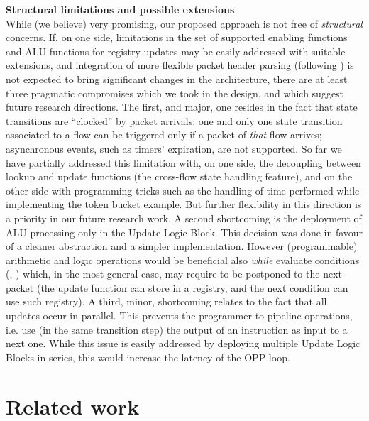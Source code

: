 \documentclass{sig-alternate}
\begin{document}
\vspace{3pt} \noindent \textbf{Structural limitations and possible extensions} \\
While (we believe) very promising, our proposed approach is not free of {\em structural} concerns. If, on one side, limitations in the set of supported enabling functions and ALU functions for registry updates may be easily addressed with suitable extensions, and integration of more flexible packet header parsing (following \cite{Bos14}) is not expected to bring significant changes in the architecture, there are at least three pragmatic compromises which we took in the design, and which suggest future research directions. The first, and major, one resides in the fact that state transitions are ``clocked'' by packet arrivals: one and only one state transition associated to a flow can be triggered only if a packet of {\em that} flow arrives; asynchronous events, such as timers' expiration, are not supported. So far we have partially addressed this limitation with, on one side, the decoupling between lookup and update functions (the cross-flow state handling feature), and on the other side with programming tricks such as the handling of time performed while implementing the token bucket example. But further flexibility in this direction is a priority in our future research work.  A second shortcoming is the deployment of ALU processing only in the Update Logic Block. This decision was done in favour of a cleaner abstraction and a simpler implementation. However (programmable) arithmetic and logic operations would be beneficial also {\em while} evaluate conditions (, ) which, in the most general case, may require to be postponed to the next packet (the update function can store  in a registry, and the next condition can use such registry). A third, minor, shortcoming relates to the fact that all updates occur in parallel. This prevents the programmer to pipeline operations, i.e. use (in the same transition step) the output of an instruction as input to a next one. While this issue is easily addressed by deploying multiple Update Logic Blocks in series, this would increase the latency of the OPP loop.




\section{Related work}
\label{s:related}
\end{document}

